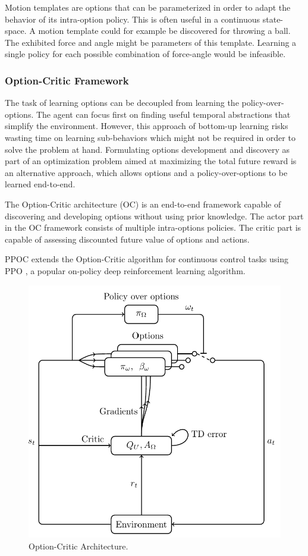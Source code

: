 Motion templates \cite{motion_templates} are options that can be parameterized in order to adapt the behavior of its intra-option policy.
This is often useful in a continuous state-space. A motion template could for example be discovered for throwing a ball. The exhibited
force and angle might be parameters of this template. Learning a single policy for each possible combination of force-angle would be infeasible.

\subsubsection{Option-Critic Framework}

The task of learning options can be decoupled from learning the policy-over-options. The agent can focus first on finding useful temporal
abstractions that simplify the environment. However, this approach of bottom-up learning risks wasting time on learning sub-behaviors which might not be required
in order to solve the problem at hand. Formulating options development and discovery as part of an optimization problem aimed at maximizing the
total future reward is an alternative approach, which allows options and a policy-over-options to be learned end-to-end.

The Option-Critic architecture (OC) \cite{option-critic} is an end-to-end framework capable of discovering and developing options without
using prior knowledge. The actor part in the OC framework consists of multiple intra-options policies. The critic part is capable of assessing discounted
future value of options and actions.

PPOC \cite{PPOC} extends the Option-Critic algorithm for continuous control tasks using PPO \cite{PPO}, a popular on-policy deep reinforcement learning algorithm.

\begin{figure}[H]
    \centering
    \label{fig:options_critic}
    \caption{Option-Critic Architecture.}
    \includegraphics[scale=0.2]{Images/option-critic.png}
\end{figure}

